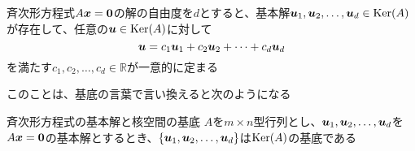 \documentclass[../../../topic_linear-algebra]{subfiles}
\begin{document}
斉次形方程式$A\vb*{x} = \vb*{0}$の解の自由度を$d$とすると、基本解$\vb*{u}_1, \vb*{u}_2, \dots, \vb*{u}_d \in \operatorname{Ker}(A)$が存在して、任意の$\vb*{u} \in \operatorname{Ker}(A)$に対して
\begin{equation*}
  \vb*{u} = c_1 \vb*{u}_1 + c_2 \vb*{u}_2 + \cdots + c_d \vb*{u}_d
\end{equation*}
を満たす$c_1, c_2, \dots, c_d \in \mathbb{R}$が一意的に定まる

\br

このことは、基底の言葉で言い換えると次のようになる

\begin{theorem}{斉次形方程式の基本解と核空間の基底}
  $A$を$m \times n$型行列とし、$\vb*{u}_1, \vb*{u}_2, \dots, \vb*{u}_d$を$A\vb*{x} = \vb*{0}$の基本解とするとき、$\{ \vb*{u}_1, \vb*{u}_2, \dots, \vb*{u}_d \}$は$\operatorname{Ker}(A)$の基底である
\end{theorem}
\end{document}
